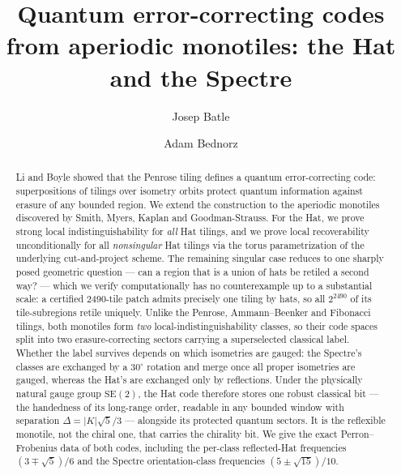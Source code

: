 \documentclass[a4paper,unpublished]{quantumarticle}
\theoremstyle{remark}
\newcommand{\SEtwo}{\mathrm{SE}(2)}
\begin{document}
\title{Quantum error-correcting codes from aperiodic monotiles:
the Hat and the Spectre}

\author{Josep Batle}
\author{Adam Bednorz}

\maketitle

\begin{abstract}
Li and Boyle showed that the Penrose tiling defines a quantum
error-correcting code: superpositions of tilings over isometry orbits
protect quantum information against erasure of any bounded region. We
extend the construction to the aperiodic monotiles discovered by
Smith, Myers, Kaplan and Goodman-Strauss. For the Hat, we prove
strong local indistinguishability for \emph{all} Hat tilings, and we
prove local recoverability unconditionally for all \emph{nonsingular}
Hat tilings via the torus parametrization of the underlying
cut-and-project scheme. The remaining singular case reduces to one
sharply posed geometric question --- can a region that is a union of
hats be retiled a second way? --- which we verify computationally has
no counterexample up to a substantial scale: a certified $2490$-tile
patch admits precisely one tiling by hats, so all $2^{2490}$ of its
tile-subregions retile uniquely. Unlike the Penrose, Ammann--Beenker
and Fibonacci tilings, both monotiles form \emph{two}
local-indistinguishability classes, so their code spaces split into
two erasure-correcting sectors carrying a superselected classical
label. Whether the label survives depends on which isometries are
gauged: the Spectre's classes are exchanged by a $30^{\circ}$
rotation and merge once all proper isometries are gauged, whereas the
Hat's are exchanged only by reflections. Under the physically natural
gauge group $\SEtwo$, the Hat code therefore stores one robust
classical bit --- the handedness of its long-range order, readable in
any bounded window with separation $\Delta = |K|\sqrt{5}/3$ ---
alongside its protected quantum sectors. It is the reflexible
monotile, not the chiral one, that carries the chirality bit. We give
the exact Perron--Frobenius data of both codes, including the
per-class reflected-Hat frequencies $(3\mp\sqrt{5})/6$ and the
Spectre orientation-class frequencies $(5\pm\sqrt{15})/10$.
\end{abstract}
\end{document}
